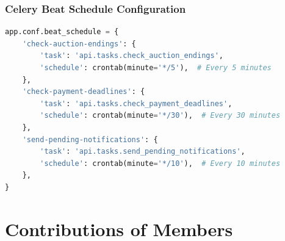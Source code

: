 \documentclass[12pt,a4paper]{article}
\begin{document}
\subsubsection{Celery Beat Schedule Configuration}
\begin{lstlisting}[language=Python, caption={Periodic Task Schedule (MadeInPK/celery.py)}]
app.conf.beat_schedule = {
    'check-auction-endings': {
        'task': 'api.tasks.check_auction_endings',
        'schedule': crontab(minute='*/5'),  # Every 5 minutes
    },
    'check-payment-deadlines': {
        'task': 'api.tasks.check_payment_deadlines',
        'schedule': crontab(minute='*/30'),  # Every 30 minutes
    },
    'send-pending-notifications': {
        'task': 'api.tasks.send_pending_notifications',
        'schedule': crontab(minute='*/10'),  # Every 10 minutes
    },
}
\end{lstlisting}

\newpage

\section{Contributions of Members}
\end{document}
